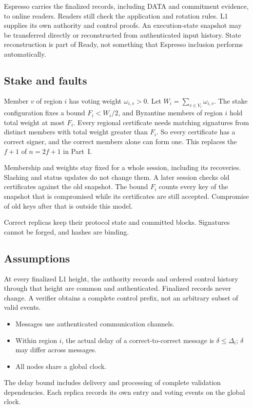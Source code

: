 Espresso carries the finalized records, including DATA and commitment
evidence, to online readers. Readers still check the application and
rotation rules. L1 supplies its own authority and control proofs.
An execution-state snapshot may be transferred directly or reconstructed
from authenticated input history. State reconstruction is part of Ready,
not something that Espresso inclusion performs automatically.

\subsection{Stake and faults}
\label{sec:stake}
Member $v$ of region $i$ has voting weight $\omega_{i,v}>0$. Let
$W_i=\sum_{v\in V_i}\omega_{i,v}$. The stake configuration
fixes a bound $F_i<W_i/2$, and Byzantine members of region $i$ hold
total weight at most $F_i$. Every regional certificate needs
matching signatures from distinct members with total weight greater than
$F_i$. So every certificate has a correct signer, and the correct members
alone can form one. This replaces the $f+1$ of $n=2f+1$ in Part~I.

Membership and weights stay fixed for a whole session, including its
recoveries. Slashing and status updates do not change them. A later
session checks old certificates against the old snapshot. The bound
$F_i$ counts every key of the snapshot that is compromised while its
certificates are still accepted. Compromise of old keys after that is
outside this model.

Correct replicas keep their protocol state and committed blocks.
Signatures cannot be forged, and hashes are binding.



\subsection{Assumptions}
\label{sec:assumptions}
\begin{assumption}
\label{ass:authority}
At every finalized L1 height, the authority records and ordered control
history through that height are common and authenticated. Finalized
records never change. A verifier obtains a complete control prefix,
not an arbitrary subset of valid events.
\end{assumption}

\begin{assumption}
\label{ass:network}
\leavevmode\par
\begin{itemize}
\item Messages use authenticated communication channels.
\item Within region $i$, the actual delay of a correct-to-correct
message is $\delta\le\Delta_i$; $\delta$ may differ across messages.
\item All nodes share a global clock.
\end{itemize}
\end{assumption}
The delay bound includes delivery and processing of complete validation
dependencies. Each replica records its own entry and voting events on
the global clock.

